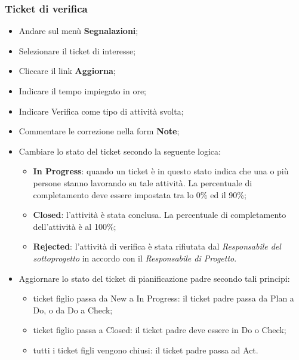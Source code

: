 \documentclass[a4paper,12pt]{article}
\begin{document}
{\subsubsection{Ticket di verifica}
{
\begin{itemize}
\item Andare sul menù \textbf{Segnalazioni}; 
\item Selezionare il ticket di interesse; 
\item Cliccare il link \textbf{Aggiorna}; 
\item Indicare il tempo impiegato in ore; 
\item Indicare Verifica come tipo di attività svolta; 
\item Commentare le correzione nella form \textbf{Note}; 
\item Cambiare lo stato del ticket secondo la seguente logica:
		\begin{itemize}
		\item \textbf{In Progress}: quando un ticket è in questo stato indica che una o più persone 
		stanno lavorando su tale attività. La percentuale di completamento deve 
		essere impostata tra lo 0\% ed il 90\%; 
		\item \textbf{Closed}: l’attività è stata conclusa. La percentuale di completamento dell’attività è al 100\%; 
		\item \textbf{Rejected}: l’attività di verifica è stata rifiutata dal \emph{Responsabile del sottoprogetto} in accordo con il \emph{Responsabile di Progetto}. 
		
		\end{itemize}

\item Aggiornare lo stato del ticket di pianificazione padre secondo tali principi:
		\begin{itemize}
		\item ticket figlio passa da New a In Progress: il ticket padre passa da Plan a Do, 
		o da Do a Check; 
		\item ticket figlio passa a Closed: il ticket padre deve essere in Do o Check; 
		\item tutti i ticket figli vengono chiusi: il ticket padre passa ad Act. 
		
		\end{itemize} 

\end{itemize} 
}
}
\end{document}
